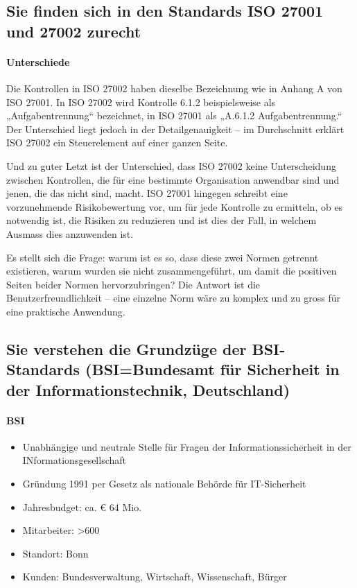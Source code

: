 \documentclass[10pt,a4paper]{article}
\begin{document}
\subsection*{Sie finden sich in den Standards ISO 27001 und 27002 zurecht}
\paragraph*{Unterschiede}Die Kontrollen in ISO 27002 haben dieselbe Bezeichnung wie in Anhang A von ISO 27001. In ISO 27002 wird Kontrolle 6.1.2 beispielsweise als „Aufgabentrennung“ bezeichnet, in ISO 27001 als „A.6.1.2 Aufgabentrennung.“ Der Unterschied liegt jedoch in der Detailgenauigkeit – im Durchschnitt erklärt ISO 27002 ein Steuerelement auf einer ganzen Seite.

Und zu guter Letzt ist der Unterschied, dass ISO 27002 keine Unterscheidung zwischen Kontrollen, die für eine bestimmte Organisation anwendbar sind und jenen, die das nicht sind, macht. ISO 27001 hingegen schreibt eine vorzunehmende Risikobewertung vor, um für jede Kontrolle zu ermitteln, ob es notwendig ist, die Risiken zu reduzieren und ist dies der Fall, in welchem Ausmass dies anzuwenden ist.

Es stellt sich die Frage: warum ist es so, dass diese zwei Normen getrennt existieren, warum wurden sie nicht zusammengeführt, um damit die positiven Seiten beider Normen hervorzubringen? Die Antwort ist die Benutzerfreundlichkeit – eine einzelne Norm wäre zu komplex und zu gross für eine praktische Anwendung\cite{advisera}.


\subsection*{Sie verstehen die Grundzüge der BSI-Standards (BSI=Bundesamt für Sicherheit in der Informationstechnik, Deutschland)}
\paragraph*{BSI}
\begin{itemize}[noitemsep,topsep=0pt,leftmargin=*]
    \item Unabhängige und neutrale Stelle für Fragen der Informationssicherheit in der INformationsgesellschaft
    \item Gründung 1991 per Gesetz als nationale Behörde für IT-Sicherheit
    \item Jahresbudget: ca. € 64 Mio.
    \item Mitarbeiter: \textgreater600
    \item Standort: Bonn
    \item Kunden: Bundesverwaltung, Wirtschaft, Wissenschaft, Bürger
\end{itemize}
\end{document}
